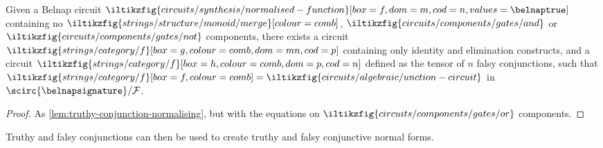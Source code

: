 \begin{lemma}\label{lem:falsy-conjunction-normalising}
    Given a Belnap circuit \(
    \iltikzfig{circuits/synthesis/normalised-function}[box=f,dom=m,cod=n,values=\belnaptrue]
    \) containing no \(
    \iltikzfig{strings/structure/monoid/merge}[colour=comb]
    \), \(
    \iltikzfig{circuits/components/gates/and}
    \) or \(
    \iltikzfig{circuits/components/gates/not}
    \) components, there exists a circuit \(
    \iltikzfig{strings/category/f}[box=g,colour=comb,dom=mn,cod=p]
    \) containing only identity and elimination constructs, and a circuit \(
    \iltikzfig{strings/category/f}[box=h,colour=comb,dom=p,cod=n]
    \) defined as the tensor of \(n\) falsy conjunctions, such that \(
    \iltikzfig{strings/category/f}[box=f,colour=comb]
    =
    \iltikzfig{circuits/algebraic/unction-circuit}
    \) in \(\scirc{\belnapsignature} / \mathcal{F}\).
\end{lemma}
\begin{proof}
    As \cref{lem:truthy-conjunction-normalising}, but with the equations
    on \(\iltikzfig{circuits/components/gates/or}\) components.
\end{proof}

Truthy and falsy conjunctions can then be used to create truthy and falsy
conjunctive normal forms.

